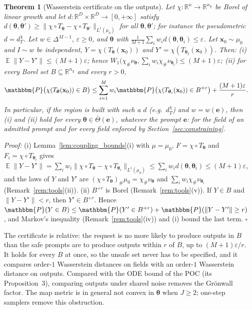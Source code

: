 \documentclass{article}
\DeclareMathOperator{\E}{\mathbb{E}}
\newcommand{\RR}{\mathbb{R}}
\newcommand{\PP}{\mathbbm{P}}
\newcommand{\bth}{\boldsymbol{\theta}}
\newcommand{\bx}{\mathbf{x}}
\newcommand{\be}{\mathbf{e}}
\newcommand{\Tbar}{\bar{\Theta}}
\theoremstyle{plain}
\newtheorem{theorem}{Theorem}[section]
\theoremstyle{remark}
\begin{document}
\begin{theorem}[Wasserstein certificate on the outputs]\label{th:certificate}
Let $\chi:\RR^n\to\RR^{n_\chi}$ be Borel of linear growth and let $d:\RR^D\times\RR^D\to[0,+\infty]$ satisfy
$d(\bth,\bth')\ge\|\chi\circ T_{\bth}-\chi\circ T_{\bth'}\|_{L^1(\mu_0)}$ for all $\bth,\bth'$; for instance the pseudometric $d=d^\chi_T$. Let
$w\in\Delta^{M-1}$, $\varepsilon\ge0$, and $\bth$ with $\frac{1}{M+1}\sum_iw_id(\bth,\bth_i)\le\varepsilon$. Let $\bx_0\sim\mu_0$ and $I\sim w$
be independent, $Y=\chi(T_{\bth}(\bx_0))$ and $Y'=\chi(T_{\bth_I}(\bx_0))$. Then:
(i) $\E\|Y-Y'\|\le(M+1)\varepsilon$; hence $W_1\big(\chi_\#\nu_{\bth},\sum_iw_i\chi_\#\nu_{\bth_i}\big)\le(M+1)\varepsilon$;
(ii) for every Borel set $B\subseteq\RR^{n_\chi}$ and every $r>0$,
\[
\PP\big(\chi(T_{\bth}(\bx_0))\in B\big)\le\sum_{i=1}^Mw_i\PP\big(\chi(T_{\bth_i}(\bx_0))\in B^{+r}\big)+\frac{(M+1)\varepsilon}{r}.
\]
In particular, if the region is built with such a $d$ (e.g.\ $d^\chi_T$) and $w=w(\be)$, then (i) and (ii)
hold for every $\bth\in\Tbar(\be)$, whatever the prompt $\be$: for the field of an admitted prompt and for
every field enforced by Section~\ref{sec:constraining}.
\end{theorem}
\textit{Proof:}
(i) Lemma~\ref{lem:coupling_bounds}(i) with $\mu=\mu_0$, $F=\chi\circ T_{\bth}$ and $F_i=\chi\circ T_{\bth_i}$ gives
$\E\|Y-Y'\|=\sum_iw_i\|\chi\circ T_{\bth}-\chi\circ T_{\bth_i}\|_{L^1(\mu_0)}\le\sum_iw_id(\bth,\bth_i)\le(M+1)\varepsilon$, and the laws of $Y$ and $Y'$ are
$(\chi\circ T_{\bth})_\#\mu_0=\chi_\#\nu_{\bth}$ and $\sum_iw_i\chi_\#\nu_{\bth_i}$ (Remark~\ref{rem:tools}(ii)).
(ii) $B^{+r}$ is Borel (Remark~\ref{rem:tools}(v)). If $Y\in B$ and $\|Y-Y'\|<r$, then $Y'\in B^{+r}$. Hence
$\PP(Y\in B)\le\PP(Y'\in B^{+r})+\PP(\|Y-Y'\|\ge r)$, and Markov's inequality (Remark~\ref{rem:tools}(iv)) and (i) bound the last term.
\hfill$\square$

The certificate is relative: the request is no more likely to produce outputs in $B$ than the
safe prompts are to produce outputs within $r$ of $B$, up to $(M+1)\varepsilon/r$. It holds for every
$B$ at once, so the unsafe set never has to be specified, and it compares order-$1$ Wasserstein
distances on fields with an order-$1$ Wasserstein distance on outputs. Compared with the ODE
bound of the POC (its Proposition~3), comparing outputs under shared noise removes the
Gr\"onwall factor. The map metric is in
general not convex in $\bth$ when $J\ge2$; one-step samplers remove this obstruction.
\end{document}
